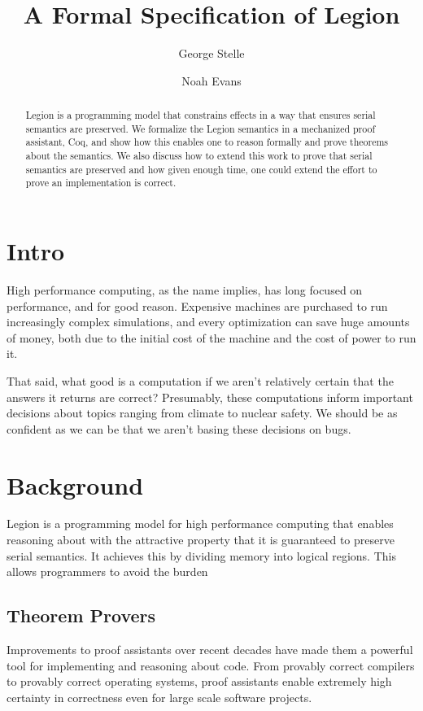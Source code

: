 \title{A Formal Specification of Legion}
\author{George Stelle  \and Noah Evans }

\begin{abstract}
Legion is a programming model that constrains effects in a way that ensures
serial semantics are preserved. We formalize the Legion semantics in a
mechanized proof assistant, Coq, and show how this enables one to reason
formally and prove theorems about the semantics. We also discuss how to extend
this work to prove that serial semantics are preserved and how given enough
time, one could extend the effort to prove an implementation is correct.
\end{abstract}

\section{Intro}
High performance computing, as the name implies, has long focused on
performance, and for good reason. Expensive machines are purchased to run
increasingly complex simulations, and every optimization can save huge amounts
of money, both due to the initial cost of the machine and the cost of power to
run it. 

That said, what good is a computation if we aren't relatively certain that the
answers it returns are correct? Presumably, these computations inform important
decisions about topics ranging from climate to nuclear safety. We should be as
confident as we can be that we aren't basing these decisions on bugs. 

\section{Background}

Legion is a programming model for high performance computing that enables
reasoning about with the attractive property that it is
guaranteed to preserve serial semantics. It achieves this by dividing memory
into logical regions. This allows programmers to avoid the
burden 

\subsection{Theorem Provers}

Improvements to proof assistants over recent decades have made them a powerful
tool for implementing and reasoning about code. From provably correct compilers
to provably correct operating systems, proof assistants enable extremely high
certainty in correctness even for large scale software projects. 

